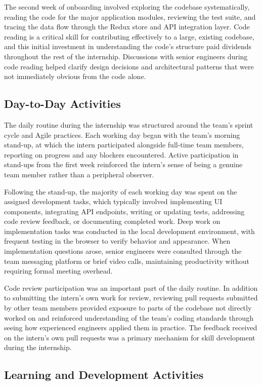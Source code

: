 The second week of onboarding involved exploring the codebase systematically, reading the code for the major application modules, reviewing the test suite, and tracing the data flow through the Redux store and API integration layer. Code reading is a critical skill for contributing effectively to a large, existing codebase, and this initial investment in understanding the code's structure paid dividends throughout the rest of the internship. Discussions with senior engineers during code reading helped clarify design decisions and architectural patterns that were not immediately obvious from the code alone.

\subsection{Day-to-Day Activities}

The daily routine during the internship was structured around the team's sprint cycle and Agile practices. Each working day began with the team's morning stand-up, at which the intern participated alongside full-time team members, reporting on progress and any blockers encountered. Active participation in stand-ups from the first week reinforced the intern's sense of being a genuine team member rather than a peripheral observer.

Following the stand-up, the majority of each working day was spent on the assigned development tasks, which typically involved implementing UI components, integrating API endpoints, writing or updating tests, addressing code review feedback, or documenting completed work. Deep work on implementation tasks was conducted in the local development environment, with frequent testing in the browser to verify behavior and appearance. When implementation questions arose, senior engineers were consulted through the team messaging platform or brief video calls, maintaining productivity without requiring formal meeting overhead.

Code review participation was an important part of the daily routine. In addition to submitting the intern's own work for review, reviewing pull requests submitted by other team members provided exposure to parts of the codebase not directly worked on and reinforced understanding of the team's coding standards through seeing how experienced engineers applied them in practice. The feedback received on the intern's own pull requests was a primary mechanism for skill development during the internship.

\subsection{Learning and Development Activities}

